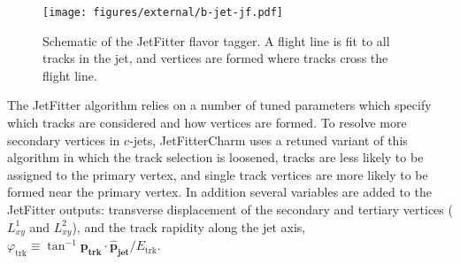 \begin{figure}
  \begin{center}
  \texttt{[image: figures/external/b-jet-jf.pdf]}
  \caption[JetFitter flavor tagging]{Schematic of the JetFitter flavor tagger. A flight line is fit to all tracks in the jet, and vertices are formed where tracks cross the flight line.}
  \label{fig:b-jet-jf}
  \end{center}
\end{figure}

The JetFitter algorithm relies on a number of tuned parameters which specify which tracks are considered and how vertices are formed. To resolve more secondary vertices in $c$-jets, JetFitterCharm uses a retuned variant of this algorithm in which the track selection is loosened, tracks are less likely to be assigned to the primary vertex, and single track vertices are more likely to be formed near the primary vertex. In addition several variables are added to the JetFitter outputs: transverse displacement of the secondary and tertiary vertices ($L^1_{xy}$ and $L^2_{xy}$), and the track rapidity along the jet axis, $\varphi_{\text{trk}} \equiv \tan^{-1} \mathbf{p_{\text{trk}}} \cdot \mathbf{\hat{p}_{\text{jet}}} / E_{\text{trk}}$.

